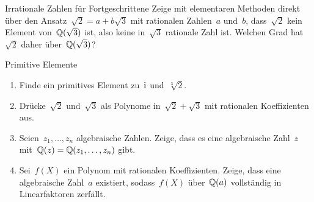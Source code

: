 \documentclass{algblatt}
\begin{document}
\begin{aufgabe}{Irrationale Zahlen für Fortgeschrittene}
Zeige mit elementaren Methoden direkt über den Ansatz~$\sqrt{2} = a +
b\sqrt{3}$ mit rationalen Zahlen~$a$ und~$b$, dass~$\sqrt{2}$ kein Element
von~$\mathbb{Q}(\sqrt{3})$ ist, also keine in~$\sqrt{3}$ rationale Zahl ist. Welchen
Grad hat~$\sqrt{2}$ daher über~$\mathbb{Q}(\sqrt{3})$?
\end{aufgabe}

\begin{aufgabe}{Primitive Elemente}
\begin{enumerate}
\item Finde ein primitives Element zu~$\mathrm{i}$ und~$\sqrt[3]{2}$.
\item Drücke~$\sqrt{2}$ und~$\sqrt{3}$ als Polynome in~$\sqrt{2} + \sqrt{3}$
mit rationalen Koeffizienten aus.
\item Seien~$z_1,\ldots,z_n$ algebraische Zahlen. Zeige, dass es eine
algebraische Zahl~$z$ mit~$\mathbb{Q}(z) = \mathbb{Q}(z_1,\ldots,z_n)$ gibt.
\item Sei~$f(X)$ ein Polynom mit rationalen Koeffizienten. Zeige, dass eine
algebraische Zahl~$a$ existiert, sodass~$f(X)$ über~$\mathbb{Q}(a)$ vollständig in
Linearfaktoren zerfällt.
\end{enumerate}
\end{aufgabe}
\end{document}
